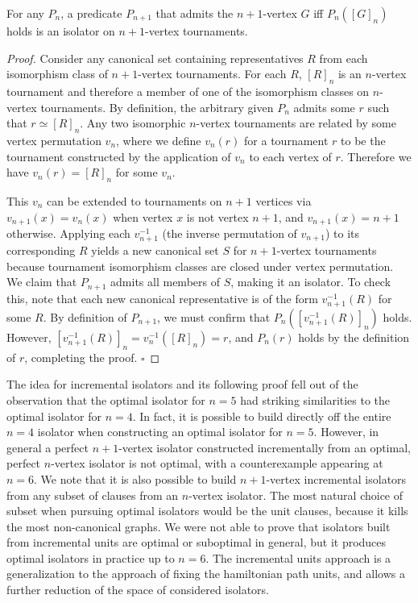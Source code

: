 \documentclass[a4paper,UKenglish,cleveref, autoref, thm-restate]{lipics-v2021}
\begin{document}
\begin{theorem}
 For any $P_n$, a predicate $P_{n+1}$ that admits the $n+1$-vertex $G$ iff $P_n([G]_n)$ holds is an isolator on $n+1$-vertex tournaments.
\end{theorem}

\begin{proof}
Consider any canonical set containing representatives $R$ from each isomorphism class of $n+1$-vertex tournaments. For each $R$, $[R]_n$ is an $n$-vertex tournament and therefore a member of one of the isomorphism classes on $n$-vertex tournaments. By definition, the arbitrary given $P_n$ admits some $r$ such that $r \simeq [R]_n$. Any two isomorphic $n$-vertex tournaments are related by some vertex permutation $v_n$, where we define $v_n(r)$ for a tournament $r$ to be the tournament constructed by the application of $v_n$ to each vertex of $r$. Therefore we have $v_n(r) = [R]_n$ for some $v_n$.

This $v_n$ can be extended to tournaments on $n+1$ vertices via $v_{n+1}(x) = v_n(x)$ when vertex $x$ is not vertex $n+1$, and $v_{n+1}(x) = n+1$ otherwise.  Applying each $v_{n+1}^{-1}$ (the inverse permutation of $v_{n+1}$) to its corresponding $R$ yields a new canonical set $S$ for $n+1$-vertex tournaments because tournament isomorphism classes are closed under vertex permutation. We claim that $P_{n+1}$ admits all members of $S$, making it an isolator. To check this, note that each new canonical representative is of the form $v_{n+1}^{-1}(R)$ for some $R$. By definition of $P_{n+1}$, we must confirm that $P_n([v_{n+1}^{-1}(R)]_n)$ holds. However, $[v_{n+1}^{-1}(R)]_n = v_n^{-1}([R]_n) = r$, and $P_n(r)$ holds by the definition of $r$, completing the proof. $\square$
\end{proof}

The idea for incremental isolators and its following proof fell out of the observation that the optimal isolator for $n=5$ had striking similarities to the optimal isolator for $n=4$. In fact, it is possible to build directly off the entire $n=4$ isolator when constructing an optimal isolator for $n=5$. However, in general a perfect $n+1$-vertex isolator constructed incrementally from an optimal, perfect $n$-vertex isolator is not optimal, with a counterexample appearing at $n=6$. We note that it is also possible to build $n+1$-vertex incremental isolators from any subset of clauses from an $n$-vertex isolator. The most natural choice of subset when pursuing optimal isolators would be the unit clauses, because it kills the most non-canonical graphs. We were not able to prove that isolators built from incremental units are optimal or suboptimal in general, but it produces optimal isolators in practice up to $n=6$. The incremental units approach is a generalization to the approach of fixing the hamiltonian path units, and allows a further reduction of the space of considered isolators.
\end{document}
